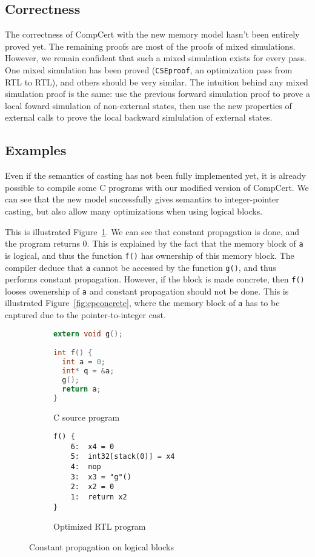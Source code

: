 \subsection{Correctness}
The correctness of CompCert with the new memory model hasn't been entirely proved yet.
The remaining proofs are most of the proofs of mixed simulations.
However, we remain confident that such a mixed simulation exists for every pass. One mixed simulation has been proved (\texttt{CSEproof}, an optimization pass from RTL to RTL), and others should be very similar. The intuition behind any mixed simulation proof is the same: use the previous forward simulation proof to prove a local foward simulation of non-external states, then use the new properties of external calls to prove the local backward simlulation of external states.


\subsection{Examples}
Even if the semantics of casting has not been fully implemented yet, it is already possible to compile some C programs with our modified version of CompCert. We can see that the new model successfully gives semantics to integer-pointer casting, but also allow many optimizations when using logical blocks.

This is illustrated Figure~\ref{fig:cplogical}. We can see that constant propagation is done, and the program returns 0. This is explained by the fact that the memory block of \texttt{a} is logical, and thus the function \texttt{f()} has ownership of this memory block. The compiler deduce that \texttt{a} cannot be accessed by the function \texttt{g()}, and thus performs constant propagation.
However, if the block is made concrete, then \texttt{f()} looses owenership of \texttt{a} and constant propagation should not be done. This is illustrated Figure~\ref{fig:cpconcrete}, where the memory block of \texttt{a} has to be captured due to the pointer-to-integer cast.

\begin{figure}
\begin{subfigure}{.48\textwidth}
  \begin{lstlisting}[language=C]
extern void g();

int f() {
  int a = 0;
  int* q = &a;
  g();
  return a;
}
\end{lstlisting}
  \caption{C source program}
\end{subfigure}
\begin{subfigure}{.48\textwidth}
  \begin{lstlisting}
f() {
    6:	x4 = 0
    5:	int32[stack(0)] = x4
    4:	nop
    3:	x3 = "g"()
    2:	x2 = 0
    1:	return x2
}
\end{lstlisting}
  \caption{Optimized RTL program}
\end{subfigure}
\caption{Constant propagation on logical blocks}
\label{fig:cplogical}
\end{figure}

